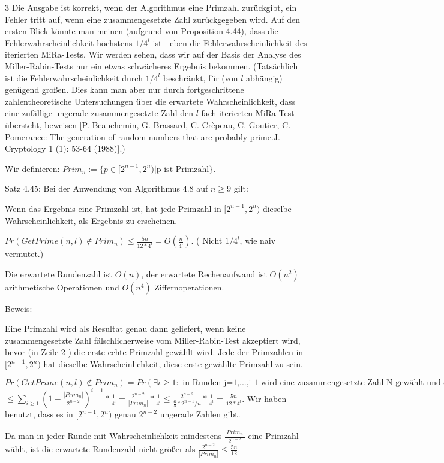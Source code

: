 \documentclass[a4paper]{article}
\begin{document}
\begin{multicols}{3}
        Die Ausgabe ist korrekt, wenn der Algorithmus eine Primzahl zurückgibt, ein Fehler tritt auf, wenn eine zusammengesetzte Zahl zurückgegeben wird. Auf den ersten Blick könnte man meinen (aufgrund von Proposition 4.44), dass die Fehlerwahrscheinlichkeit höchstens $1/4^l$ ist - eben die Fehlerwahrscheinlichkeit des iterierten MiRa-Tests. Wir werden sehen, dass wir auf der Basis der Analyse des Miller-Rabin-Tests nur ein etwas schwächeres Ergebnis bekommen. (Tatsächlich ist die Fehlerwahrscheinlichkeit durch $1/4^l$ beschränkt, für (von $l$ abhängig) genügend großen. Dies kann man aber nur durch fortgeschrittene zahlentheoretische Untersuchungen über die erwartete Wahrscheinlichkeit, dass eine zufällige ungerade zusammengesetzte Zahl den $l$-fach iterierten MiRa-Test übersteht, beweisen [P. Beauchemin, G. Brassard, C. Crèpeau, C. Goutier, C. Pomerance: The generation of random numbers that are probably prime.J. Cryptology 1 (1): 53-64 (1988)].)

        Wir definieren: $Prim_n:=\{p\in [2^{n-1}, 2^n)| \text{p ist Primzahl}\}$.

        Satz 4.45: Bei der Anwendung von Algorithmus 4.8 auf $n\geq 9$ gilt:
        \begin{enumerate*}
            \item Wenn das Ergebnis eine Primzahl ist, hat jede Primzahl in $[2^{n-1}, 2^n)$ dieselbe Wahrscheinlichkeit, als Ergebnis zu erscheinen.
            \item  $Pr(GetPrime(n,l)\not\in Prim_n)\leq \frac{5n}{12*4^l}=O(\frac{n}{4^l})$. ( Nicht $1/4^l$, wie naiv vermutet.)
            \item  Die erwartete Rundenzahl ist $O(n)$, der erwartete Rechenaufwand ist $O(n^2)$ arithmetische Operationen und $O(n^4)$ Ziffernoperationen.
        \end{enumerate*}

        Beweis:
        \begin{enumerate*}
            \item  Eine Primzahl wird als Resultat genau dann geliefert, wenn keine zusammengesetzte Zahl fälschlicherweise vom Miller-Rabin-Test akzeptiert wird, bevor (in Zeile 2 ) die erste echte Primzahl gewählt wird. Jede der Primzahlen in $[2^{n-1}, 2^n)$ hat dieselbe Wahrscheinlichkeit, diese erste gewählte Primzahl zu sein.
            \item  $Pr(GetPrime(n,l)\not\in Prim_n)= Pr(\exists i\geq 1 :\text{ in Runden j=1,...,i-1 wird eine zusammengesetzte Zahl N gewählt und erkannt}\wedge\text{in Runde i wird zusammengesetzte Zahl N gewählt und der iterierte MiRa-Test auf N liefert 0})$ $\leq\sum_{i\geq 1} (1 -\frac{|Prim_n|}{2^{n-2}})^{i-1}*\frac{1}{4^l} = \frac{2^{n-2}}{|Prim_n|} *\frac{1}{4^l} \leq \frac{2^{n-2}}{\frac{6}{5} *2^{n-1} /n}*\frac{1}{4^l} = \frac{5n}{12 * 4^l}$. Wir haben benutzt, dass es in $[2^{n-1}, 2^n)$ genau $2^{n-2}$ ungerade Zahlen gibt.
            \item  Da man in jeder Runde mit Wahrscheinlichkeit mindestens $\frac{|Prim_n|}{2^{n-2}}$ eine Primzahl wählt, ist die erwartete Rundenzahl nicht größer als $\frac{2^{n-2}}{|Prim_n|} \leq \frac{5n}{12}$.
        \end{enumerate*}


\end{multicols}
\end{document}
